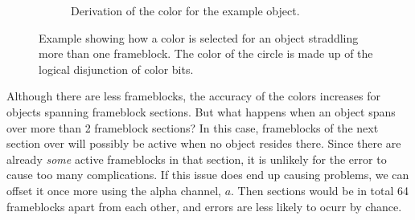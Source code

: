 \documentclass[conference]{IEEEtran}
\begin{document}
\begin{figure}[h!]
\begin{subfigure}{.5\textwidth}
\begin{center}
\end{center}
\end{subfigure}
\par\bigskip
\begin{subfigure}{.5\textwidth}
\begin{center}
\begin{minipage}[t]{\linewidth}
\hspace{0.225\linewidth}
\caption{Derivation of the color for the example object.}
\label{fig:object_color}
\end{minipage}
\end{center}
\end{subfigure}
\caption{Example showing how a color is selected for an object straddling more than one frameblock.
The color of the circle is made up of the logical disjunction of color bits.}
\label{fig:example}
\end{figure}

Although there are less frameblocks, the accuracy of the colors increases for objects spanning frameblock sections.
But what happens when an object spans over more than 2 frameblock sections?
In this case, frameblocks of the next section over will possibly be active when no object resides there.
Since there are already \textit{some} active frameblocks in that section, it is unlikely for the error to cause
too many complications.
If this issue does end up causing problems, we can offset it once more using the alpha channel, $a$.
Then sections would be in total 64 frameblocks apart from each other, and errors are less likely to ocurr by chance.
\end{document}
